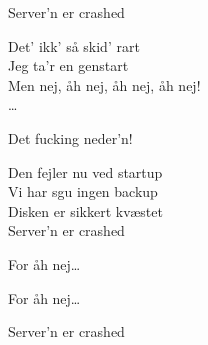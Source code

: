 \begin{song}{Server'n er crashed}
  \begin{SBVerse}
    Det' ikk' så skid' rart\\
    Jeg ta'r en genstart\\
    Men nej, åh nej, åh nej, åh nej!\\
    \ldots
  \end{SBVerse}

  \begin{SBSection*}
    Det fucking neder'n!
  \end{SBSection*}

  \begin{SBSection*}
    Den fejler nu ved startup\\
    Vi har sgu ingen backup\\
    Disken er sikkert kvæstet\\
    Server'n er crashed
  \end{SBSection*}

  \begin{SBChorus}
    For åh nej\ldots
  \end{SBChorus}

  \begin{SBChorus}
    For åh nej\ldots
  \end{SBChorus}

  \begin{SBSection*}
    Server'n er crashed
  \end{SBSection*}
\end{song}